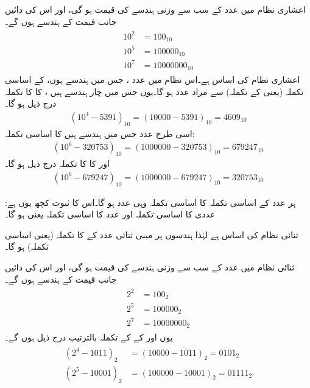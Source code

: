 اعشاری نظام میں عدد  کے سب سے وزنی ہندسے کی قیمت  ہو گی، اور اس کی دائیں جانب  قیمت کے  ہندسے ہوں گے۔
\begin{gather}
\begin{aligned}
10^2&=100_{10}\\
10^5&=100000_{10}\\
10^7&=10000000_{10}
\end{aligned}
\end{gather}
اعشاری نظام کی اساس  ہے۔اس نظام میں عدد ، جس میں  ہندسے ہوں، کے اساسی تکملہ (یعنی  کے تکملہ) سے مراد عدد  ہو گا۔یوں  جس میں چار ہندسے  ہیں ، کا  کا تکملہ درج ذیل ہو گا۔
\begin{align}
(10^4-5391)_{10}=(10000-5391)_{10}=4609_{10}
\end{align}
اسی طرح عدد  جس میں  ہندسے ہیں کا اساسی تکملہ:
\begin{align}
(10^6-320753)_{10}=(1000000-320753)_{10}=679247_{10}
\end{align} 
اور  کا  کا تکملہ درج ذیل ہو گا۔ 
\begin{align}
(10^6-679247)_{10}=(1000000-679247)_{10}=320753_{10}
\end{align} 

ہر عدد  کے اساسی تکملہ کا اساسی تکملہ وہی عدد  ہو گا۔اس کا ثبوت کچھ یوں ہے: عددی  کا اساسی تکملہ  اور عدد  کا اساسی تکملہ  یعنی  ہو گا۔


ثنائی نظام کی اساس  ہے لہٰذا  ہندسوں پر مبنی ثنائی عدد  کے  کا تکملہ (یعنی اساسی تکملہ)  ہو گا۔

ثنائی نظام میں عدد  کے سب سے وزنی ہندسے کی قیمت  ہو گی، اور اس کی دائیں جانب  قیمت کے  ہندسے ہوں گے۔
\begin{gather}
\begin{aligned}
2^2&=100_2\\
2^5&=100000_2\\
2^7&=10000000_2
\end{aligned}
\end{gather}
یوں  اور  کے  کے تکملہ بالترتیب درج ذیل ہوں گے۔
\begin{gather}
\begin{aligned}\label{مساوات_حساب_تکملہ_اساسی}
(2^4-1011)_2&=(10000-1011)_2=0101_2\\
(2^5-10001)_2&=(100000-10001)_2=01111_2
\end{aligned}
\end{gather} 


